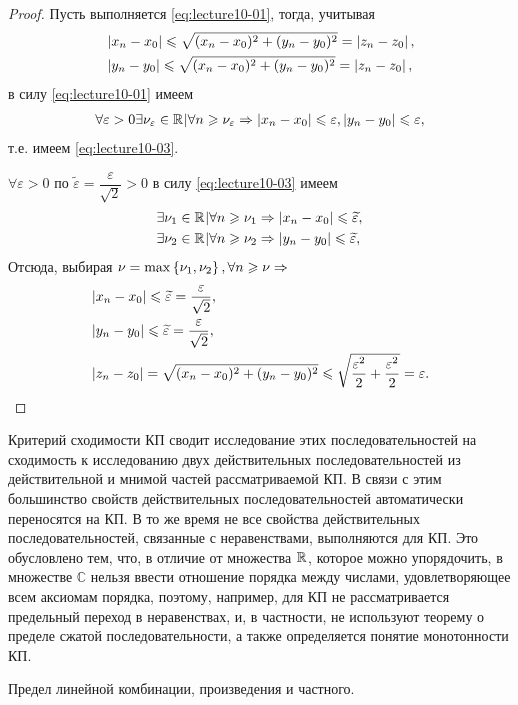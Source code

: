 \begin{proof}
  \circled{$\Rightarrow$} Пусть выполняется \eqref{eq:lecture10-01}, тогда, учитывая
  \begin{align*}
    &\left\lvert x_n - x_0 \right\rvert \leqslant \sqrt{(x_n - x_0)^2 + (y_n - y_0)^2} = \left\lvert z_n - z_0 \right\rvert,\\
    &\left\lvert y_n - y_0 \right\rvert \leqslant \sqrt{(x_n - x_0)^2 + (y_n - y_0)^2} = \left\lvert z_n - z_0 \right\rvert,\\
  \end{align*}
  в силу \eqref{eq:lecture10-01} имеем
  \begin{align*}
    \forall \varepsilon > 0 \exists \nu_{\varepsilon} \in \mathbb{R}^{} \vert \forall n \geqslant \nu_{\varepsilon} \Rightarrow \left\lvert x_n - x_0 \right\rvert \leqslant \varepsilon,
    \left\lvert y_n - y_0 \right\rvert \leqslant \varepsilon,
  \end{align*}
  т.е. имеем \eqref{eq:lecture10-03}.

  \circled{$\Leftarrow$} $\forall \varepsilon > 0$ по $\widetilde{\varepsilon} = \dfrac{\varepsilon}{\sqrt{2}} > 0$
  в силу \eqref{eq:lecture10-03} имеем
  \begin{align*}
    &\exists \nu_1 \in \mathbb{R}^{} \vert \forall n \geqslant \nu_1 \Rightarrow \left\lvert x_n - x_0 \right\rvert \leqslant \widetilde{\varepsilon},\\
    &\exists \nu_2 \in \mathbb{R}^{} \vert \forall n \geqslant \nu_2 \Rightarrow \left\lvert y_n - y_0 \right\rvert \leqslant \widetilde{\varepsilon},\\
  \end{align*}
  Отсюда, выбирая $\nu = \max\left\{ \nu_1, \nu_2 \right\}, \forall n \geqslant \nu \Rightarrow$
  \begin{align*}
    &\left\lvert x_n - x_0 \right\rvert \leqslant \widetilde{\varepsilon} = \dfrac{\varepsilon}{\sqrt{2}},\\
    &\left\lvert y_n - y_0 \right\rvert \leqslant \widetilde{\varepsilon} = \dfrac{\varepsilon}{\sqrt{2}},\\
    &\left\lvert z_n - z_0 \right\rvert = \sqrt{(x_n - x_0)^2 + (y_n - y_0)^2} \leqslant \sqrt{\dfrac{\varepsilon^2}{2} + \dfrac{\varepsilon^2}{2}} = \varepsilon.
  \end{align*}
\end{proof}

\begin{notes}
\item Критерий сходимости КП сводит исследование этих последовательностей на сходимость
  к исследованию двух действительных последовательностей из действительной и мнимой
  частей рассматриваемой КП. В связи с этим большинство свойств действительных последовательностей
  автоматически переносятся на КП. В то же время не все свойства действительных последовательностей,
  связанные с неравенствами, выполняются для КП. Это обусловлено тем, что, в отличие от множества
  $\mathbb{R}^{}$, которое можно упорядочить, в множестве $\mathbb{C}$ нельзя ввести отношение порядка
  между числами, удовлетворяющее всем аксиомам порядка, поэтому, например, для КП не рассматривается
  предельный переход в неравенствах, и, в частности, не используют теорему о пределе сжатой
  последовательности, а также определяется понятие монотонности КП.
\item Предел линейной комбинации, произведения и частного.
\end{notes}
